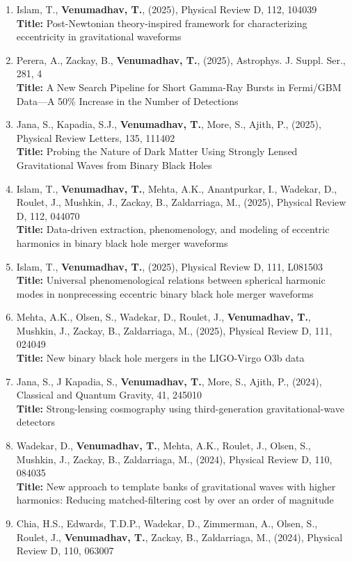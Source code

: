 \documentclass{article}
\newcommand{\apjs}{Astrophys. J. Suppl. Ser.}
\newcommand{\cqg}{Classical and Quantum Gravity}
\newcommand{\prd}{Physical Review D}
\newcommand{\prl}{Physical Review Letters}
\begin{document}
{\begin{enumerate}[leftmargin=*,itemsep=0.45em,topsep=0.35em]
\textbf{Title:} Sampler-free gravitational wave inference using matrix multiplication
\item Islam, T., \textbf{Venumadhav, T.}, (2025), \prd, 112, 104039 \\
\textbf{Title:} Post-Newtonian theory-inspired framework for characterizing eccentricity in gravitational waveforms
\item Perera, A., Zackay, B., \textbf{Venumadhav, T.}, (2025), \apjs, 281, 4 \\
\textbf{Title:} A New Search Pipeline for Short Gamma-Ray Bursts in Fermi/GBM Data---A 50\% Increase in the Number of Detections
\item Jana, S., Kapadia, S.J., \textbf{Venumadhav, T.}, More, S., Ajith, P., (2025), \prl, 135, 111402 \\
\textbf{Title:} Probing the Nature of Dark Matter Using Strongly Lensed Gravitational Waves from Binary Black Holes
\item Islam, T., \textbf{Venumadhav, T.}, Mehta, A.K., Anantpurkar, I., Wadekar, D., Roulet, J., Mushkin, J., Zackay, B., Zaldarriaga, M., (2025), \prd, 112, 044070 \\
\textbf{Title:} Data-driven extraction, phenomenology, and modeling of eccentric harmonics in binary black hole merger waveforms
\item Islam, T., \textbf{Venumadhav, T.}, (2025), \prd, 111, L081503 \\
\textbf{Title:} Universal phenomenological relations between spherical harmonic modes in nonprecessing eccentric binary black hole merger waveforms
\item Mehta, A.K., Olsen, S., Wadekar, D., Roulet, J., \textbf{Venumadhav, T.}, Mushkin, J., Zackay, B., Zaldarriaga, M., (2025), \prd, 111, 024049 \\
\textbf{Title:} New binary black hole mergers in the LIGO-Virgo O3b data
\item Jana, S., J Kapadia, S., \textbf{Venumadhav, T.}, More, S., Ajith, P., (2024), \cqg, 41, 245010 \\
\textbf{Title:} Strong-lensing cosmography using third-generation gravitational-wave detectors
\item Wadekar, D., \textbf{Venumadhav, T.}, Mehta, A.K., Roulet, J., Olsen, S., Mushkin, J., Zackay, B., Zaldarriaga, M., (2024), \prd, 110, 084035 \\
\textbf{Title:} New approach to template banks of gravitational waves with higher harmonics: Reducing matched-filtering cost by over an order of magnitude
\item Chia, H.S., Edwards, T.D.P., Wadekar, D., Zimmerman, A., Olsen, S., Roulet, J., \textbf{Venumadhav, T.}, Zackay, B., Zaldarriaga, M., (2024), \prd, 110, 063007 \\

\end{enumerate}}
\end{document}
